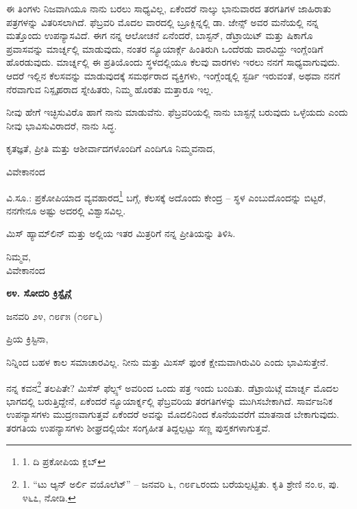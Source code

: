 ಈ ತಿಂಗಳು ನಿಜವಾಗಿಯೂ ನಾನು ಬರಲು ಸಾಧ್ಯವಿಲ್ಲ, ಏಕೆಂದರೆ ನಾಲ್ಕು ಭಾನುವಾರದ ತರಗತಿಗಳ ಜಾಹಿರಾತು ಪತ್ರಗಳನ್ನು ವಿತರಿಸಲಾಗಿದೆ. ಫೆಬ್ರವರಿ ಮೊದಲ ವಾರದಲ್ಲಿ ಬ್ರೂಕ್ಲಿನ್ನಲ್ಲಿ ಡಾ. ಜೇನ್ಸ್ ಅವರ ಮನೆಯಲ್ಲಿ ನನ್ನ ಮತ್ತೊಂದು ಉಪನ್ಯಾಸವಿದೆ. ಈಗ ನನ್ನ ಆಲೋಚನೆ ಏನೆಂದರೆ, ಬಾಸ್ಟನ್, ಡೆಟ್ರಾಯಿಟ್ ಮತ್ತು ಷಿಕಾಗೊ ಪ್ರವಾಸವನ್ನು ಮಾರ್ಚ್ನಲ್ಲಿ ಮಾಡುವುದು, ನಂತರ ನ್ಯೂಯಾರ್ಕ್ಗೆ ಹಿಂತಿರುಗಿ ಒಂದೆರಡು ವಾರವಿದ್ದು ಇಂಗ್ಲೆಂಡಿಗೆ ಹೊರಡುವುದು. ಮಾರ್ಚ್ನಲ್ಲಿ ಈ ಪ್ರತಿಯೊಂದು ಸ್ಥಳದಲ್ಲಿಯೂ ಕೆಲವು ವಾರಗಳು ಇರಲು ನನಗೆ ಸಾಧ್ಯವಾಗುವುದು. ಆದರೆ ಇಲ್ಲಿನ ಕೆಲಸವನ್ನು ಮಾಡುವುದಕ್ಕೆ ಸಮರ್ಥರಾದ ವ್ಯಕ್ತಿಗಳು, ಇಂಗ್ಲೆಂಡ್ನಲ್ಲಿ ಸ್ಟರ್ಡಿ ಇರುವಂತೆ, ಅಥವಾ ನನಗೆ ನೆರವಾಗುವ ನಿಸ್ಪೃಹರಾದ ಸ್ನೇಹಿತರು, ನಿಮ್ಮ ಹೊರತು ಮತ್ತಾರೂ ಇಲ್ಲ.

ನೀವು ಹೇಗೆ ಇಚ್ಛಿಸುವಿರೊ ಹಾಗೆ ನಾನು ಮಾಡುವೆನು. ಫೆಬ್ರವರಿಯಲ್ಲಿ ನಾನು ಬಾಸ್ಟನ್ಗೆ ಬರುವುದು ಒಳ್ಳೆಯದು ಎಂದು ನೀವು ಭಾವಿಸುವಿರಾದರೆ, ನಾನು ಸಿದ್ಧ.

ಕೃತಜ್ಞತೆ, ಪ್ರೀತಿ ಮತ್ತು ಆಶೀರ್ವಾದಗಳೊಂದಿಗೆ ಎಂದಿಗೂ ನಿಮ್ಮವನಾದ,

\begin{flushright}
ವಿವೇಕಾನಂದ
\end{flushright}

ವಿ.ಸೂ.: ಪ್ರಕೋಪಿಯಾದ ವ್ಯವಹಾರದ\footnote{1. ದಿ ಪ್ರಕೋಪಿಯ ಕ್ಲಬ್} ಬಗ್ಗೆ, ಕೆಲಸಕ್ಕೆ ಅದೊಂದು ಕೇಂದ್ರ – ಸ್ಥಳ ಎಂಬುದೊಂದನ್ನು ಬಿಟ್ಟರೆ, ನನಗೇನೂ ಅಷ್ಟು ಅದರಲ್ಲಿ ವಿಶ್ವಾಸವಿಲ್ಲ.

ಮಿಸ್ ಹ್ಯಾಮ್​ಲಿನ್ ಮತ್ತು ಅಲ್ಲಿಯ ಇತರ ಮಿತ್ರರಿಗೆ ನನ್ನ ಪ್ರೀತಿಯನ್ನು ತಿಳಿಸಿ.

\begin{flushright}
ನಿಮ್ಮವ,\\ವಿವೇಕಾನಂದ
\end{flushright}

\begin{center}
\textbf{೮೪. ಸೋದರಿ ಕ್ರಿಸ್ಟೈನ್ಗೆ}
\end{center}

\begin{flushright}
ಜನವರಿ ೨೪, ೧೮೯೫ (೧೮೯೬)
\end{flushright}

ಪ್ರಿಯ ಕ್ರಿಸ್ಟಿನಾ,

ನಿನ್ನಿಂದ ಬಹಳ ಕಾಲ ಸಮಾಚಾರವಿಲ್ಲ. ನೀನು ಮತ್ತು ಮಿಸಸ್ ಫುಂಕೆ ಕ್ಷೇಮವಾಗಿರುವಿರಿ ಎಂದು ಭಾವಿಸುತ್ತೇನೆ.

ನನ್ನ ಕವನ\footnote{1. “ಟು ಆ್ಯನ್ ಅರ್ಲಿ ವಯೊಲೆಟ್” – ಜನವರಿ ೬, ೧೮೯೬ರಂದು ಬರೆಯಲ್ಪಟ್ಟಿತು. ಕೃತಿ ಶ್ರೇಣಿ ನಂ.೮, ಪು. ೪೬೭, ನೋಡಿ.} ತಲಪಿತೇ? ಮಿಸೆಸ್ ಫೆಲ್ಪ್ಸ್ ಅವರಿಂದ ಒಂದು ಪತ್ರ ಇಂದು ಬಂದಿತು. ಡೆಟ್ರಾಯಿಟ್ಗೆ ಮಾರ್ಚ್ನ ಮೊದಲ ಭಾಗದಲ್ಲಿ ಬರುತ್ತಿದ್ದೇನೆ, ಏಕೆಂದರೆ ನ್ಯೂಯಾರ್ಕ್ನಲ್ಲಿ ಫೆಬ್ರವರಿಯ ತರಗತಿಗಳನ್ನು ಮುಗಿಸಬೇಕಾಗಿದೆ. ಸಾರ್ವಜನಿಕ ಉಪನ್ಯಾಸಗಳು ಮುದ್ರಣವಾಗುತ್ತವೆ ಏಕೆಂದರೆ ಅವನ್ನು ಮೊದಲಿನಿಂದ ಕೊನೆಯವರೆಗೆ ಮಾತನಾಡ ಬೇಕಾಗುವುದು. ತರಗತಿಯ ಉಪನ್ಯಾಸಗಳು ಶೀಘ್ರದಲ್ಲಿಯೇ ಸಂಗೃಹೀತ ತಿದ್ದಲ್ಪಟ್ಟು ಸಣ್ಣ ಪುಸ್ತಕಗಳಾಗುತ್ತವೆ.

